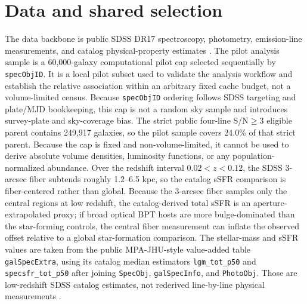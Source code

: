 \documentclass[twocolumn]{aastex631}
\begin{document}
\section{Data and shared selection}
The data backbone is public SDSS DR17 spectroscopy, photometry, emission-line measurements, and catalog physical-property estimates \citep{york2000,sdssdr17,brinchmann2004}. The pilot analysis sample is a 60,000-galaxy computational pilot cap selected sequentially by \texttt{specObjID}. It is a local pilot subset used to validate the analysis workflow and establish the relative association within an arbitrary fixed cache budget, not a volume-limited census. Because \texttt{specObjID} ordering follows SDSS targeting and plate/MJD bookkeeping, this cap is not a random sky sample and introduces survey-plate and sky-coverage bias. The strict public four-line S/N$\geq3$ eligible parent contains 249,917 galaxies, so the pilot sample covers 24.0\% of that strict parent. Because the cap is fixed and non-volume-limited, it cannot be used to derive absolute volume densities, luminosity functions, or any population-normalized abundance.
Over the redshift interval $0.02<z<0.12$, the SDSS 3-arcsec fiber subtends roughly 1.2--6.5 kpc, so the catalog sSFR comparison is fiber-centered rather than global.
Because the 3-arcsec fiber samples only the central regions at low redshift, the catalog-derived total sSFR is an aperture-extrapolated proxy; if broad optical BPT hosts are more bulge-dominated than the star-forming controls, the central fiber measurement can inflate the observed offset relative to a global star-formation comparison.
The stellar-mass and sSFR values are taken from the public MPA-JHU-style value-added table \texttt{galSpecExtra}, using its catalog median estimators \texttt{lgm\_tot\_p50} and \texttt{specsfr\_tot\_p50} after joining \texttt{SpecObj}, \texttt{galSpecInfo}, and \texttt{PhotoObj}. Those are low-redshift SDSS catalog estimates, not rederived line-by-line physical measurements \citep{brinchmann2004,sdssdr17,york2000}.
\end{document}
